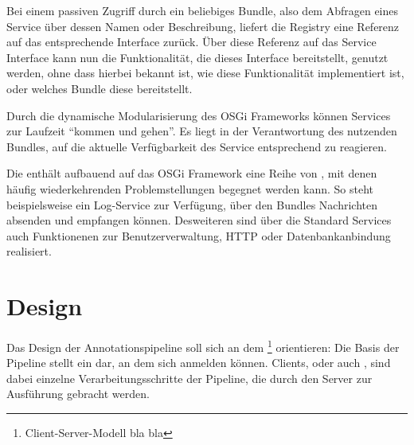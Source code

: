 Bei einem passiven Zugriff durch ein beliebiges Bundle, also dem Abfragen eines
Service über dessen Namen oder Beschreibung, liefert die Registry eine
Referenz auf das entsprechende Interface zurück.
Über diese Referenz auf das Service Interface kann nun die Funktionalität, die
dieses Interface bereitstellt, genutzt werden, ohne dass hierbei bekannt ist,
wie diese Funktionalität implementiert ist, oder welches Bundle diese
bereitstellt.

Durch die dynamische Modularisierung des OSGi Frameworks können Services zur
Laufzeit \enquote{kommen und gehen}. Es liegt in der Verantwortung des
nutzenden Bundles, auf die aktuelle Verfügbarkeit des Service entsprechend zu
reagieren.

Die  enthält aufbauend auf das OSGi Framework eine
Reihe von , mit denen häufig wiederkehrenden
Problemstellungen begegnet werden kann. So steht beispielsweise ein Log-Service
zur Verfügung, über den Bundles Nachrichten absenden und empfangen können.
Desweiteren sind über die Standard Services auch Funktionenen zur
Benutzerverwaltung, HTTP oder Datenbankanbindung realisiert.
\citep{wtherich_die_2008}

\section{Design}
Das Design der Annotationspipeline soll sich an dem 
\footnote{Client-Server-Modell bla bla} orientieren:
Die Basis der Pipeline stellt ein  dar, an dem sich
 anmelden können.
Clients, oder auch , sind dabei einzelne Verarbeitungsschritte der
Pipeline, die durch den Server zur Ausführung gebracht werden.


